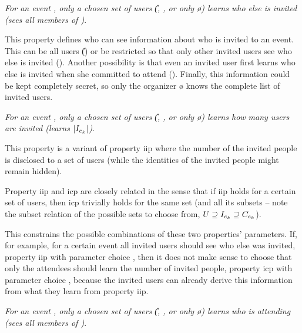 {
	\setlength{\parskip}{.5em}
	
	\begin{propertydef}[\Ac{iip}]
		\textit{For an event \e{}, only a chosen 
		set of users (\eg \U{}, \I{}, \C{} or only \o{}) learns
		who else is invited (\ie sees all members of \I{})}.
		\par \noindent
		This property defines who can see information about who is invited to
		an event. 
		This can be all users (\U{}) or be restricted so that only other
		invited users see who else is invited (\I{}). Another
		possibility is that even an invited user first learns who else is
		invited when she committed to attend (\C{}). Finally, this
		information could be kept completely secret, so only the organizer \o{}
	    knows the complete list of invited users.
	\end{propertydef}
	
	\begin{propertydef}[\Ac{icp}]
		\textit{For an event \e{}, only a chosen 
		set of users (\eg \U{}, \I{}, \C{} or only \o{}) learns
		how many users are invited (\ie learns $| \I{} |$)}.
		\par \noindent
		This property is a variant of property \Ac{iip} where the number of
		the invited people \I{} is disclosed to a set of users (while
		the identities of the invited people might remain hidden).
	\end{propertydef}
	Property \Ac{iip} and \Ac{icp} are closely related in the sense that if \Ac{iip}
	holds for a certain set of users, then \Ac{icp} trivially holds for
	the same set (and all its subsets -- note the 
	subset relation of the possible sets to choose from, $\U{} \supseteq \I{} \supseteq \C{}$). 
	
	\noindent This constrains the possible combinations 
	of these two properties' parameters. If, for example, for a certain event all 
	invited users \I{} should see who else was invited, \ie property \Ac{iip} with parameter 
	choice \I{}, then it does not make sense to choose that only the attendees \C{} should 
	learn the number of invited people, \ie property \Ac{icp} with parameter choice 
	\C{}, because the invited users can already derive this information from what 
	they learn from property \Ac{iip}.

	\begin{propertydef}[\Ac{aip}]
		\textit{For an event \e{}, only a chosen
		set of users (\eg \U{}, \I{}, \C{} or only \o{}) learns
		who is attending (\ie sees all members of \C{})}.
	\end{propertydef}

}
